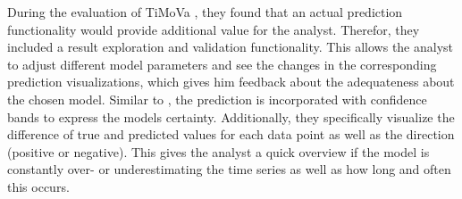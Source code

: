 \documentclass[electronic]{vgtc}             %
\begin{document}
During the evaluation of TiMoVa \cite{boegl:2013}, they found that an actual prediction functionality would provide additional value for the analyst.
Therefor, they included a result exploration and validation functionality.
This allows the analyst to adjust different model parameters and see the changes in the corresponding prediction visualizations, which gives him feedback about the adequateness about the chosen model. 
Similar to \cite{buono:2007}, the prediction is incorporated with confidence bands to express the models certainty. 
Additionally, they specifically visualize the difference of true and predicted values for each data point as well as the direction (positive or negative).
This gives the analyst a quick overview if the model is constantly over- or underestimating the time series as well as how long and often this occurs.



\end{document}

